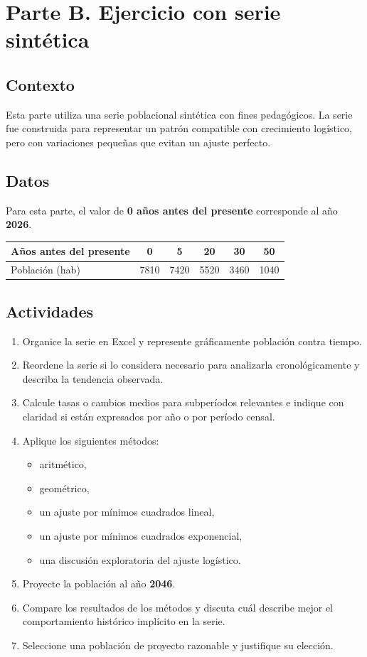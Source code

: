 \documentclass[11pt]{scrartcl}
\begin{document}
\section{Parte B. Ejercicio con serie sintética}

\subsection{Contexto}
Esta parte utiliza una serie poblacional sintética con fines
pedagógicos. La serie fue construida para representar un patrón
compatible con crecimiento logístico, pero con variaciones pequeñas que
evitan un ajuste perfecto.

\subsection{Datos}
Para esta parte, el valor de \textbf{0 años antes del presente}
corresponde al año \textbf{2026}.

\begin{center}
\begin{tabular}{l *{5}{S[table-format=4.0]}}
  \toprule
  {Años antes del presente} & {0} & {5} & {20} & {30} & {50} \\
  \midrule
  {Población (hab)} & 7810 & 7420 & 5520 & 3460 & 1040 \\
  \bottomrule
\end{tabular}
\end{center}

\subsection{Actividades}
\begin{enumerate}
  \item Organice la serie en Excel y represente gráficamente población
    contra tiempo.
  \item Reordene la serie si lo considera necesario para analizarla
    cronológicamente y describa la tendencia observada.
  \item Calcule tasas o cambios medios para subperíodos relevantes e
    indique con claridad si están expresados por año o por período
    censal.
  \item Aplique los siguientes métodos:
    \begin{itemize}
      \item aritmético,
      \item geométrico,
      \item un ajuste por mínimos cuadrados lineal,
      \item un ajuste por mínimos cuadrados exponencial,
      \item una discusión exploratoria del ajuste logístico.
    \end{itemize}
  \item Proyecte la población al año \textbf{2046}.
  \item Compare los resultados de los métodos y discuta cuál describe
    mejor el comportamiento histórico implícito en la serie.
  \item Seleccione una población de proyecto razonable y justifique su
    elección.
\end{enumerate}
\end{document}
